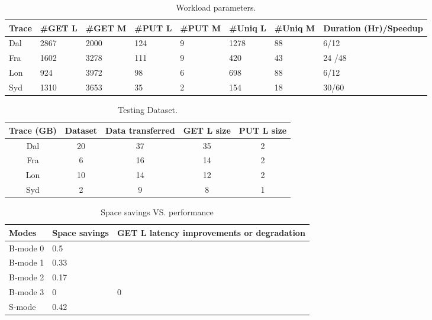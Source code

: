 
\begin{table}[h!]
	\scriptsize
	\caption{Workload parameters.}
	\begin{tabular}{| p{0.38cm} | p{0.5cm} | p{0.5cm} | p{0.5cm} | p{0.5cm}| p{0.5cm}| p{0.5cm}| p{1.25cm} |} 
		\hline
	Trace    &   \#GET L & \#GET M & \#PUT L & \#PUT M & \#Uniq L & \#Uniq M & Duration (Hr)/Speedup \\ 
		\hline\hline
		Dal    &  2867  & 2000   & 124  & 9     & 1278 & 88  & 6/12    \\ 
		\hline
		Fra     &  1602  & 3278   & 111  & 9     & 420 & 43  & 24 /48   \\
		\hline
		Lon    &  924    & 3972   & 98  & 6      & 698 & 88  & 6/12    \\
		\hline 
		Syd      &  1310   & 3653   & 35 & 2     & 154 & 18  & 30/60    \\  
		\hline
	\end{tabular}

\label{tab:eval-overall}
\end{table}


\begin{table}[h!]
	\scriptsize 
	\caption{Testing Dataset.}
	\begin{tabular}{| c | c | c | c | c | } 
		\hline
		Trace  (GB)  &   Dataset  & Data transferred  & GET L size  & PUT L size  \\ 
		\hline\hline
		Dal   & 20  & 37 & 35 & 2    \\ 
		\hline
		Fra     & 6  & 16 & 14 & 2   \\
		\hline
		Lon    &10   &  14 &12  & 2      \\
		\hline 
		Syd      &  2  &  9 & 8 & 1      \\  
		\hline
	\end{tabular}
	
	\label{tab:eval-dataset}
\end{table}



\begin{table}[h!]
	\scriptsize
	\caption{Space savings VS. performance}
	\begin{tabular}{| l | l | p{3cm}| } %
		\hline
		Modes    & Space savings & GET L latency improvements or degradation  \\ 
		\hline\hline
		B-mode 0    &   0.5   &     \\ 
		\hline
		B-mode 1    &   0.33   &     \\ 
		\hline
		B-mode 2    &   0.17   &     \\
		\hline
		B-mode 3     &   0   &    0\\
		\hline
		S-mode    &  0.42    &     \\
		\hline
	\end{tabular}
	
	\label{tab:eval-schemes}
\end{table}